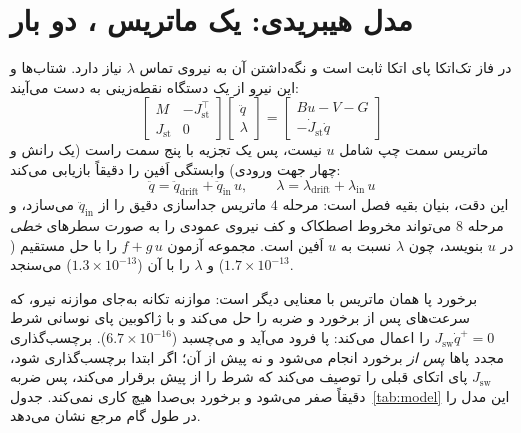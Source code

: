 \documentclass[10pt,twocolumn]{article}
\newcommand{\en}[1]{\lr{#1}}
\begin{document}
\section{مدل هیبریدی: یک ماتریس \en{KKT}، دو بار}
در فاز تک‌اتکا پای اتکا ثابت است و نگه‌داشتن آن به نیروی تماس $\lambda$ نیاز دارد. شتاب‌ها و
این نیرو از یک دستگاه نقطه‌زینی به دست می‌آیند:
\begin{equation}
\begin{bmatrix} M & -J_{\mathrm{st}}^{\top} \\ J_{\mathrm{st}} & 0 \end{bmatrix}
\begin{bmatrix} \ddot q \\ \lambda \end{bmatrix}
=
\begin{bmatrix} Bu - V - G \\ -\dot J_{\mathrm{st}}\dot q \end{bmatrix}
\label{eq:kkt}
\end{equation}
ماتریس سمت چپ شامل $u$ نیست، پس یک تجزیه با پنج سمت راست (یک رانش و چهار جهت ورودی)
وابستگی اَفین را دقیقاً بازیابی می‌کند:
\begin{equation}
\ddot q = \ddot q_{\mathrm{drift}} + \ddot q_{\mathrm{in}}\,u,\qquad
\lambda = \lambda_{\mathrm{drift}} + \lambda_{\mathrm{in}}\,u
\label{eq:affinesplit}
\end{equation}
این دقت، بنیان بقیه فصل است: مرحله $4$ ماتریس جداسازی دقیق را از $\ddot q_{\mathrm{in}}$
می‌سازد، و مرحله $8$ می‌تواند مخروط اصطکاک و کف نیروی عمودی را به صورت سطرهای \emph{خطی} در $u$
بنویسد، چون $\lambda$ نسبت به $u$ اَفین است. مجموعه آزمون $f+g\,u$ را با حل مستقیم \en{KKT}
($1.7\times10^{-13}$) و $\lambda$ را با آن ($1.3\times10^{-13}$) می‌سنجد.

برخورد پا همان ماتریس با معنایی دیگر است: موازنه تکانه به‌جای موازنه نیرو، که سرعت‌های پس از
برخورد و ضربه را حل می‌کند و با ژاکوبین پای نوسانی شرط $J_{\mathrm{sw}}\dot q^{+}=0$ را اعمال
می‌کند: پا فرود می‌آید و می‌چسبد ($6.7\times10^{-16}$). برچسب‌گذاری مجدد پاها \emph{پس از}
برخورد انجام می‌شود و نه پیش از آن؛ اگر ابتدا برچسب‌گذاری شود، $J_{\mathrm{sw}}$ پای اتکای
قبلی را توصیف می‌کند که شرط را از پیش برقرار می‌کند، پس ضربه دقیقاً صفر می‌شود و برخورد
بی‌صدا هیچ کاری نمی‌کند. جدول~\ref{tab:model} این مدل را در طول گام مرجع نشان می‌دهد.
\end{document}
